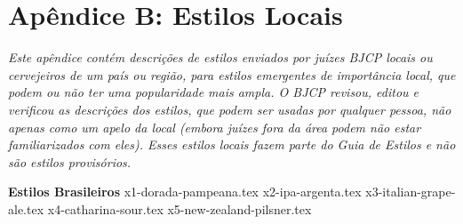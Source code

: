 \clearpage
{}
\divisorLine
\section*{Apêndice B: Estilos Locais}

\textit{Este apêndice contém descrições de estilos enviados por juízes BJCP locais ou cervejeiros de um país ou região, para estilos emergentes de importância local, que podem ou não ter uma popularidade mais ampla. O BJCP revisou, editou e verificou as descrições dos estilos, que podem ser usadas por qualquer pessoa, não apenas como um apelo da local (embora juízes fora da área podem não estar familiarizados com eles). Esses estilos locais fazem parte do Guia de Estilos e não são estilos provisórios.}

\begin{multicols}{2}

  \textbf{\Large\color{blue}
  Estilos Brasileiros
  }
  {x1-dorada-pampeana.tex}
	{x2-ipa-argenta.tex}
	{x3-italian-grape-ale.tex}
	{x4-catharina-sour.tex}
	{x5-new-zealand-pilsner.tex}

\end{multicols}
